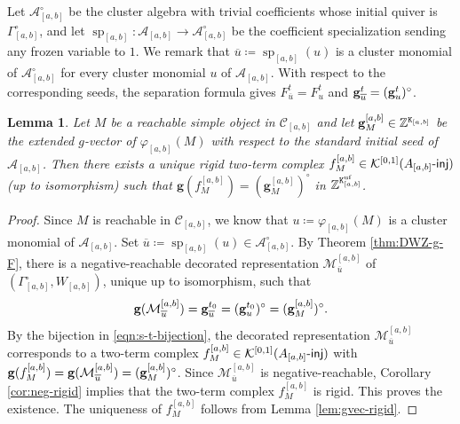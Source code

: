 \documentclass[12pt]{amsart}
\newtheorem{lemma}[theorem]{Lemma}
\theoremstyle{definition}
\theoremstyle{remark}
\numberwithin{equation}{section}
\newcommand{\injc}{\mathchar`-\mathsf{inj}}
\begin{document}
Let $\mathcal A_{[a,b]}^\circ$ be the cluster algebra with trivial
coefficients whose initial quiver is $\Gamma_{[a,b]}^\circ$, and let
$\operatorname{sp}_{[a,b]}\colon
\mathcal A_{[a,b]}\longrightarrow \mathcal A_{[a,b]}^\circ$
be the coefficient specialization sending any frozen variable to $1$.
We remark that $\overline u\coloneqq\operatorname{sp}_{[a,b]}(u)$
is a cluster monomial of $\mathcal A_{[a,b]}^\circ$ for every cluster monomial $u$ of $\mathcal A_{[a,b]}$. With
respect to the corresponding seeds, the separation formula gives
$F_{\overline u}^{t}=F_u^{t}$ and
${\bf g}_{\overline u}^{t}=({\bf g}_u^{t})^\circ$.
\begin{lemma}\label{lem:f-Mab}
 Let $M$ be a reachable simple object in $\mathcal{C}_{[a,b]}$ and let ${\bf g}_M^{[a,b]}\in\mathbb Z^{\mathtt K_{[a,b]}}$ be the extended $g$-vector of $\varphi_{[a,b]}(M)$ with respect to the standard initial seed of $\mathcal A_{[a,b]}$. Then there exists a unique rigid two-term complex $f_M^{[a,b]}\in\mathcal{K}^{[0,1]}(A_{[a,b]}\injc)$  (up to isomorphism) such that  $\mathbf{g}(f_M^{[a,b]}) = (\mathbf{g}_M^{{[a,b]}})^\circ$ in $\mathbb Z^{\mathtt K_{[a,b]}^{\rm uf}}$.
\end{lemma}
\begin{proof}
Since $M$ is reachable in $\mathcal C_{[a,b]}$, we know that $u\coloneq \varphi_{[a,b]}(M)$ is a cluster monomial of $\mathcal A_{[a,b]}$. Set $\overline u\coloneqq\operatorname{sp}_{[a,b]}(u)\in \mathcal A_{[a,b]}^\circ$. By Theorem \ref{thm:DWZ-g-F}, there is a negative-reachable decorated representation $\mathcal M_{\overline u}^{[a,b]}$ of $(\Gamma_{[a,b]}^\circ, W_{[a,b]})$, unique up to isomorphism, such that
\[
{\bf g}(\mathcal M_{\overline u}^{[a,b]})
={\bf g}_{\overline u}^{t_0}
=({\bf g}_u^{t_0})^\circ
=({\bf g}_M^{[a,b]})^\circ.
\]
By the bijection in \eqref{eqn:s-t-bijection}, the decorated representation $\mathcal M_{\overline u}^{[a,b]}$ corresponds to a two-term complex $f_M^{[a,b]}\in \mathcal{K}^{[0,1]}(A_{[a,b]}\injc)$ with $\mathbf{g}(f_M^{[a,b]}) = {\bf g}(\mathcal M_{\overline u}^{[a,b]})=(\mathbf{g}_M^{{[a,b]}})^\circ$. Since $\mathcal M_{\overline u}^{[a,b]}$ is negative-reachable, Corollary \ref{cor:neg-rigid} implies that the two-term complex $f_M^{[a,b]}$ is rigid. This proves the existence. The uniqueness of $f_M^{[a,b]}$ follows from Lemma \ref{lem:gvec-rigid}.
\end{proof}
\end{document}
